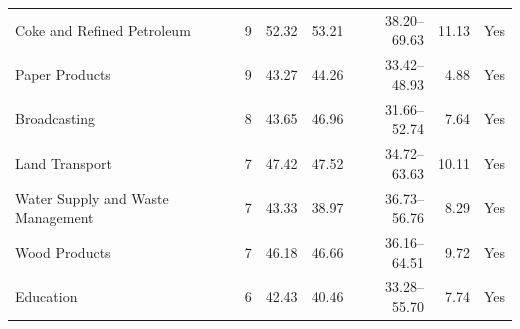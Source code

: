 \begin{table}[H]
\begin{singlepagetable}
\begin{tabular}{@{}L{6.0cm}rrrrrr@{}}
Coke and Refined Petroleum & 9 & 52.32 & 53.21 & 38.20--69.63 & 11.13 & Yes \\
Paper Products & 9 & 43.27 & 44.26 & 33.42--48.93 & 4.88 & Yes \\
Broadcasting & 8 & 43.65 & 46.96 & 31.66--52.74 & 7.64 & Yes \\
Land Transport & 7 & 47.42 & 47.52 & 34.72--63.63 & 10.11 & Yes \\
Water Supply and Waste Management & 7 & 43.33 & 38.97 & 36.73--56.76 & 8.29 & Yes \\
Wood Products & 7 & 46.18 & 46.66 & 36.16--64.51 & 9.72 & Yes \\
Education & 6 & 42.43 & 40.46 & 33.28--55.70 & 7.74 & Yes \\
\bottomrule
\end{tabular}
\end{singlepagetable}
\end{table}

\clearpage

